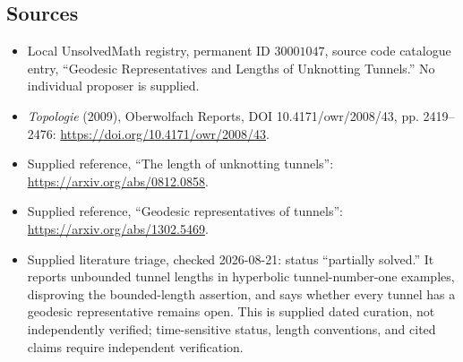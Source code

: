 \documentclass[11pt]{article}
\begin{document}
\subsection{Sources}
\begin{itemize}
\item Local UnsolvedMath registry, permanent ID \(30001047\), source code catalogue entry, ``Geodesic Representatives and Lengths of Unknotting Tunnels.'' No individual proposer is supplied.
\item \emph{Topologie} (2009), Oberwolfach Reports, DOI 10.4171/owr/2008/43, pp. 2419--2476: \url{https://doi.org/10.4171/owr/2008/43}.
\item Supplied reference, ``The length of unknotting tunnels'': \url{https://arxiv.org/abs/0812.0858}.
\item Supplied reference, ``Geodesic representatives of tunnels'': \url{https://arxiv.org/abs/1302.5469}.
\item Supplied literature triage, checked 2026-08-21: status ``partially solved.'' It reports unbounded tunnel lengths in hyperbolic tunnel-number-one examples, disproving the bounded-length assertion, and says whether every tunnel has a geodesic representative remains open. This is supplied dated curation, not independently verified; time-sensitive status, length conventions, and cited claims require independent verification.
\end{itemize}
\end{document}
